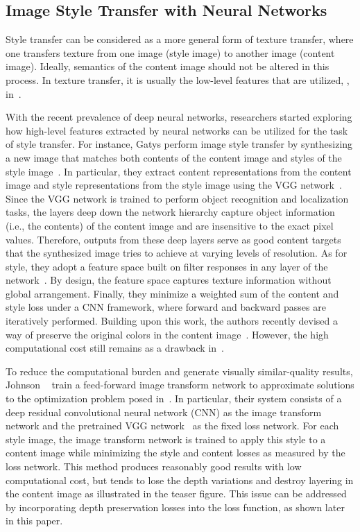 \documentclass[10pt,twocolumn,letterpaper]{article}
\begin{document}
\subsection{Image Style Transfer with Neural Networks}

Style transfer can be considered as a more general form of texture transfer, where one transfers texture from one image (style image) to another image (content image). Ideally, semantics of the content image should not be altered in this process. In texture transfer, it is usually the low-level features that are utilized, \eg, in~\cite{efros2001image}.

With the recent prevalence of deep neural networks, researchers started exploring how high-level features extracted by neural networks can be utilized for the task of style transfer. For instance, Gatys \etal perform image style transfer by synthesizing a new image that matches both contents of the content image and styles of the style image~\cite{gatys2016image}. In particular, they extract content representations from the content image and style representations from the style image using the VGG network~\cite{simonyan2014very}. Since the VGG network is trained to perform object recognition and localization tasks, the layers deep down the network hierarchy capture object information (i.e., the contents) of the content image and are insensitive to the exact pixel values. Therefore, outputs from these deep layers serve as good content targets that the synthesized image tries to achieve at varying levels of resolution. As for style, they adopt a feature space built on filter responses in any layer of the network~\cite{gatys2015texture}. By design, the feature space captures texture information without global arrangement. Finally, they minimize a weighted sum of the content and style loss under a CNN framework, where forward and backward passes are iteratively performed. Building upon this work, the authors recently devised a way of preserve the original colors in the content image~\cite{gatys2016preserving}. However, the high computational cost still remains as a drawback in~\cite{gatys2016image}.

To reduce the computational burden and generate visually similar-quality results, Johnson \etal~\cite{johnson2016perceptual} train a feed-forward image transform network to approximate solutions to the optimization problem posed in~\cite{gatys2016image}. In particular, their system consists of a deep residual convolutional neural network (CNN) as the image transform network and the pretrained VGG network~\cite{simonyan2014very} as the fixed loss network. For each style image, the image transform network is trained to apply this style to a content image while minimizing the style and content losses as measured by the loss network. This method produces reasonably good results with low computational cost, but tends to lose the depth variations and destroy layering in the content image as illustrated in the teaser figure. This issue can be addressed by incorporating depth preservation losses into the loss function, as shown later in this paper.
\end{document}
